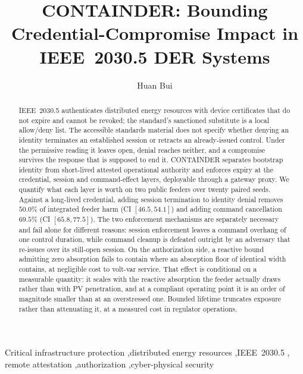 \documentclass[review]{elsarticle}
\begin{document}
\begin{frontmatter}

\title{CONTAINDER: Bounding Credential-Compromise Impact in
IEEE~2030.5 DER Systems}

\author{Huan Bui}

\begin{abstract}
IEEE~2030.5 authenticates distributed energy resources with device certificates that do not expire
and cannot be revoked; the standard's sanctioned substitute is a local allow/deny list. The
accessible standards material does not specify whether denying an identity terminates an
established session or retracts an already-issued control. Under the permissive reading it leaves
open, denial reaches neither, and a compromise survives the response that is supposed to end it.
CONTAINDER separates bootstrap identity from short-lived attested operational authority and
enforces expiry at the credential, session and command-effect layers, deployable through a gateway
proxy. We quantify what each layer is worth on two public feeders over twenty paired seeds. Against a long-lived credential, adding
session termination to identity denial removes $50.0\%$ of integrated feeder harm (CI
$[46.5, 54.1]$) and adding command cancellation $69.5\%$ (CI $[65.8, 77.5]$). The two enforcement
mechanisms are separately necessary and fail alone for different reasons: session enforcement
leaves a command overhang of one control duration, while command cleanup is defeated outright by
an adversary that re-issues over its still-open session. On the authorization side, a reactive
bound admitting zero absorption fails to contain where an absorption floor of identical width
contains, at negligible cost to volt-var service. That effect is conditional on a measurable
quantity: it scales with the reactive absorption the feeder actually draws rather than with PV
penetration, and at a compliant operating point it is an order of magnitude smaller than at an
overstressed one. Bounded lifetime truncates exposure rather than attenuating it, at a measured
cost in regulator operations.
\end{abstract}

\begin{keyword}
Critical infrastructure protection \sep distributed energy resources \sep IEEE~2030.5 \sep
remote attestation \sep authorization \sep cyber-physical security
\end{keyword}

\end{frontmatter}
\end{document}
